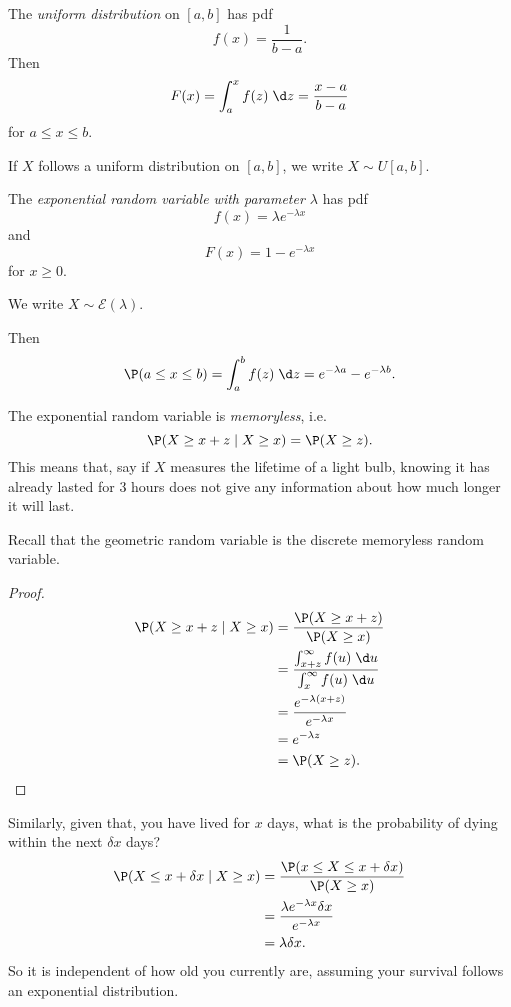 \documentclass[a4paper]{article}
\begin{document}
\begin{defi}
  The \emph{uniform distribution} on $[a, b]$ has pdf
  \[
    f(x) = \frac{1}{b - a}.
  \]
  Then
  \[
    F(x) = \int_a^x f(z)\;\d z = \frac{x - a}{b - a}
  \]
  for $a \leq x \leq b$.

  If $X$ follows a uniform distribution on $[a, b]$, we write $X\sim U[a, b]$.
\end{defi}
\begin{defi}
  The \emph{exponential random variable with parameter $\lambda$} has pdf
  \[
    f(x) = \lambda e^{-\lambda x}
  \]
  and
  \[
    F(x) = 1 - e^{-\lambda x}
  \]
  for $x \geq 0$.

  We write $X \sim \mathcal{E}(\lambda)$.
\end{defi}

Then
\[
  \P(a \leq x \leq b) = \int_a^b f(z) \;\d z = e^{-\lambda a} - e^{-\lambda b}.
\]
\begin{prop}
  The exponential random variable is \emph{memoryless}, i.e.
  \[
    \P(X \geq x + z \mid X \geq x) = \P(X \geq z).
  \]
  This means that, say if $X$ measures the lifetime of a light bulb, knowing it has already lasted for 3 hours does not give any information about how much longer it will last.
\end{prop}
Recall that the geometric random variable is the discrete memoryless random variable.

\begin{proof}
  \begin{align*}
    \P(X \geq x + z \mid X \geq x) &= \frac{\P(X \geq x + z)}{\P(X \geq x)}\\
    &= \frac{\int_{x + z}^\infty f(u)\;\d u}{\int_x^\infty f(u)\;\d u}\\
    &= \frac{e^{-\lambda(x + z)}}{e^{-\lambda x}}\\
    &= e^{-\lambda z}\\
    &= \P(X \geq z).
  \end{align*}
\end{proof}

Similarly, given that, you have lived for $x$ days, what is the probability of dying within the next $\delta x$ days?
\begin{align*}
  \P(X \leq x + \delta x \mid X \geq x) &= \frac{\P(x \leq X \leq x + \delta x)}{\P(X \geq x)}\\
  &= \frac{\lambda e^{-\lambda x} \delta x}{e^{-\lambda x}}\\
  &= \lambda \delta x.
\end{align*}
So it is independent of how old you currently are, assuming your survival follows an exponential distribution.
\end{document}
